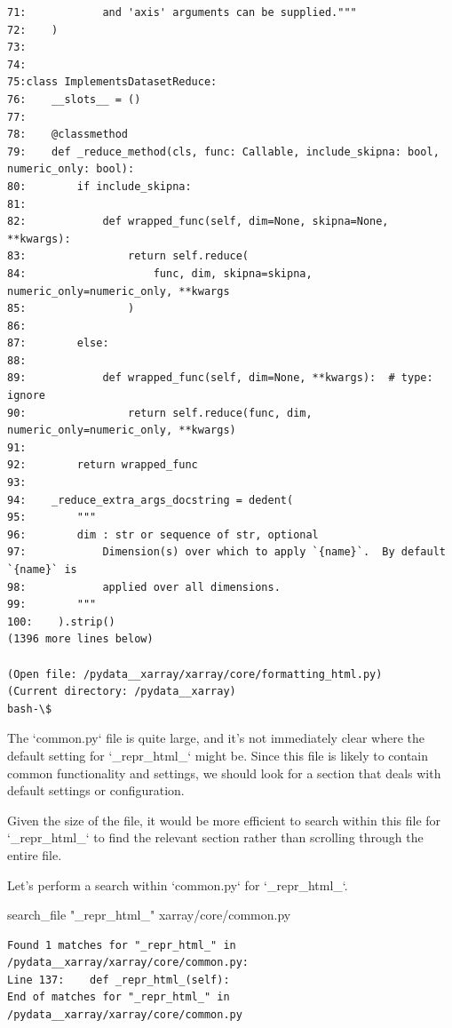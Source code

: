 {\begin{observationbox}
\begin{Verbatim}[breaklines=true, breakanywhere=true]
71:            and 'axis' arguments can be supplied."""
72:    )
73:
74:
75:class ImplementsDatasetReduce:
76:    __slots__ = ()
77:
78:    @classmethod
79:    def _reduce_method(cls, func: Callable, include_skipna: bool, numeric_only: bool):
80:        if include_skipna:
81:
82:            def wrapped_func(self, dim=None, skipna=None, **kwargs):
83:                return self.reduce(
84:                    func, dim, skipna=skipna, numeric_only=numeric_only, **kwargs
85:                )
86:
87:        else:
88:
89:            def wrapped_func(self, dim=None, **kwargs):  # type: ignore
90:                return self.reduce(func, dim, numeric_only=numeric_only, **kwargs)
91:
92:        return wrapped_func
93:
94:    _reduce_extra_args_docstring = dedent(
95:        """
96:        dim : str or sequence of str, optional
97:            Dimension(s) over which to apply `{name}`.  By default `{name}` is
98:            applied over all dimensions.
99:        """
100:    ).strip()
(1396 more lines below)

(Open file: /pydata__xarray/xarray/core/formatting_html.py)
(Current directory: /pydata__xarray)
bash-\$
\end{Verbatim}
\end{observationbox}
\begin{agentbox}
The `common.py` file is quite large, and it's not immediately clear where the default setting for `\_repr\_html\_` might be. Since this file is likely to contain common functionality and settings, we should look for a section that deals with default settings or configuration.



Given the size of the file, it would be more efficient to search within this file for `\_repr\_html\_` to find the relevant section rather than scrolling through the entire file.



Let's perform a search within `common.py` for `\_repr\_html\_`.



\hrulefill
\begin{CodeVerbatim}[breaklines=true, breakanywhere=true]
search_file "_repr_html_" xarray/core/common.py
\end{CodeVerbatim}
\end{agentbox}
\begin{observationbox}\begin{Verbatim}[breaklines=true, breakanywhere=true]
Found 1 matches for "_repr_html_" in /pydata__xarray/xarray/core/common.py:
Line 137:    def _repr_html_(self):
End of matches for "_repr_html_" in /pydata__xarray/xarray/core/common.py


\end{Verbatim}
\end{observationbox}}
